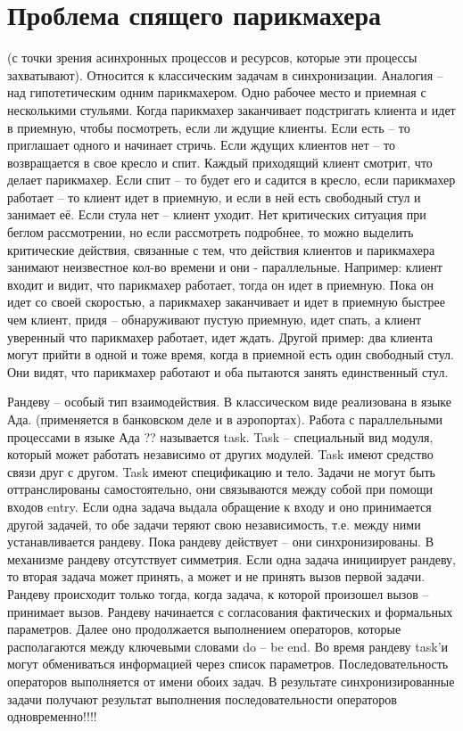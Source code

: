 \section{Проблема спящего парикмахера}

(с точки зрения асинхронных процессов и ресурсов, которые эти процессы захватывают). Относится к классическим задачам в синхронизации. Аналогия – над гипотетическим одним парикмахером. Одно рабочее место и приемная с несколькими стульями. Когда парикмахер заканчивает подстригать клиента и идет в приемную, чтобы посмотреть, если ли ждущие клиенты. Если есть – то приглашает одного и начинает стричь. Если ждущих клиентов нет – то возвращается в свое кресло и спит. Каждый приходящий клиент смотрит, что делает парикмахер. Если спит – то будет его и садится в кресло, если парикмахер работает – то клиент идет в приемную, и если в ней есть свободный стул и занимает её. Если стула нет – клиент уходит. Нет критических ситуация при беглом рассмотрении, но если рассмотреть подробнее, то можно выделить критические действия, связанные с тем, что действия клиентов и парикмахера занимают неизвестное кол-во времени и они - параллельные. Например: клиент входит и видит, что парикмахер работает, тогда он идет в приемную. Пока он идет со своей скоростью, а парикмахер заканчивает и идет в приемную быстрее чем клиент, придя – обнаруживают пустую приемную, идет спать, а клиент уверенный что парикмахер работает, идет ждать. Другой пример: два клиента могут прийти в одной и тоже время, когда в приемной есть один свободный стул. Они видят, что парикмахер работают и оба пытаются занять единственный стул. 

Рандеву – особый тип взаимодействия. В классическом виде реализована в языке Ада. (применяется в банковском деле и в аэропортах). Работа с параллельными процессами в языке Ада ?? называется task. Task – специальный вид модуля, который может работать независимо от других модулей. Task имеют средство связи друг с другом. Task имеют спецификацию и тело. Задачи не могут быть оттранслированы самостоятельно, они связываются между собой при помощи входов entry. Если одна задача выдала обращение к входу и оно принимается другой задачей, то обе задачи теряют свою независимость, т.е. между ними устанавливается рандеву. Пока рандеву действует – они синхронизированы. В механизме рандеву отсутствует симметрия. Если одна задача инициирует рандеву, то вторая задача может принять, а может и не принять вызов первой задачи. Рандеву происходит только тогда, когда задача, к которой произошел вызов – принимает вызов. Рандеву начинается с согласования фактических и формальных параметров. Далее оно продолжается выполнением операторов, которые располагаются между ключевыми словами do – be end. Во время рандеву task’и могут обмениваться информацией через список параметров. Последовательность операторов выполняется от имени обоих задач. В результате синхронизированные задачи получают результат выполнения последовательности операторов одновременно!!!!

